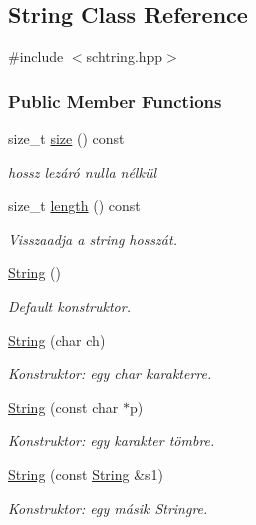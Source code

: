 \hypertarget{class_string}{}\subsection{String Class Reference}
\label{class_string}


{\ttfamily \#include $<$schtring.\+hpp$>$}

\subsubsection*{Public Member Functions}
\begin{DoxyCompactItemize}
\item 
size\+\_\+t \mbox{\hyperlink{class_string_a588c5cc9faededbb9d938662d354feed}{size}} () const
\begin{DoxyCompactList}\small\item\em hossz lezáró nulla nélkül \end{DoxyCompactList}\item 
size\+\_\+t \mbox{\hyperlink{class_string_ad3b888edbfb3bab21d4bae4663d2211a}{length}} () const
\begin{DoxyCompactList}\small\item\em Visszaadja a string hosszát. \end{DoxyCompactList}\item 
\mbox{\hyperlink{class_string_a8a7ef356e05eb9b1ea1ab518baee3095}{String}} ()
\begin{DoxyCompactList}\small\item\em Default konstruktor. \end{DoxyCompactList}\item 
\mbox{\hyperlink{class_string_a62a77180f8df2547e8be1313654abcee}{String}} (char ch)
\begin{DoxyCompactList}\small\item\em Konstruktor\+: egy char karakterre. \end{DoxyCompactList}\item 
\mbox{\hyperlink{class_string_a09ca4f1436a83ecb1c273a836b7cd4c6}{String}} (const char $\ast$p)
\begin{DoxyCompactList}\small\item\em Konstruktor\+: egy karakter tömbre. \end{DoxyCompactList}\item 
\mbox{\hyperlink{class_string_a3c682dc983b45bdbb7f3858fe4cbf221}{String}} (const \mbox{\hyperlink{class_string}{String}} \&s1)
\begin{DoxyCompactList}\small\item\em Konstruktor\+: egy másik Stringre. \end{DoxyCompactList}\item 

\end{DoxyCompactItemize}
